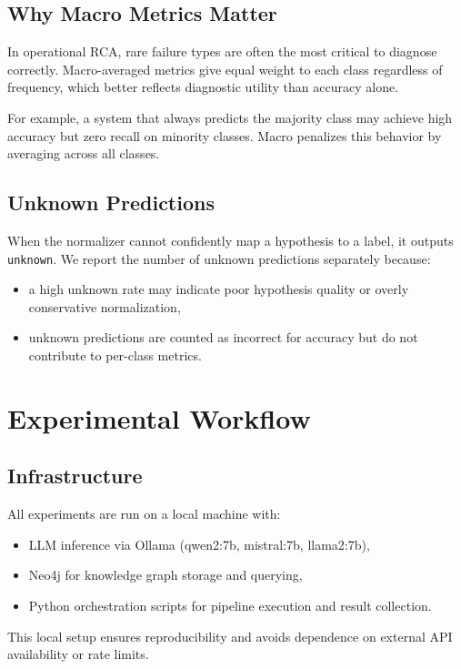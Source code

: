 \subsection{Why Macro Metrics Matter}
In operational RCA, rare failure types are often the most critical to diagnose correctly.
Macro-averaged metrics give equal weight to each class regardless of frequency, which better
reflects diagnostic utility than accuracy alone.

For example, a system that always predicts the majority class may achieve high accuracy but zero
recall on minority classes. Macro \fone{} penalizes this behavior by averaging across all classes.

\subsection{Unknown Predictions}
When the normalizer cannot confidently map a hypothesis to a label, it outputs \texttt{unknown}.
We report the number of unknown predictions separately because:
\begin{itemize}
  \item a high unknown rate may indicate poor hypothesis quality or overly conservative
        normalization,
  \item unknown predictions are counted as incorrect for accuracy but do not contribute to
        per-class metrics.
\end{itemize}

\section{Experimental Workflow}

\subsection{Infrastructure}
All experiments are run on a local machine with:
\begin{itemize}
  \item LLM inference via Ollama (qwen2:7b, mistral:7b, llama2:7b),
  \item Neo4j for knowledge graph storage and querying,
  \item Python orchestration scripts for pipeline execution and result collection.
\end{itemize}

This local setup ensures reproducibility and avoids dependence on external API availability or
rate limits.

